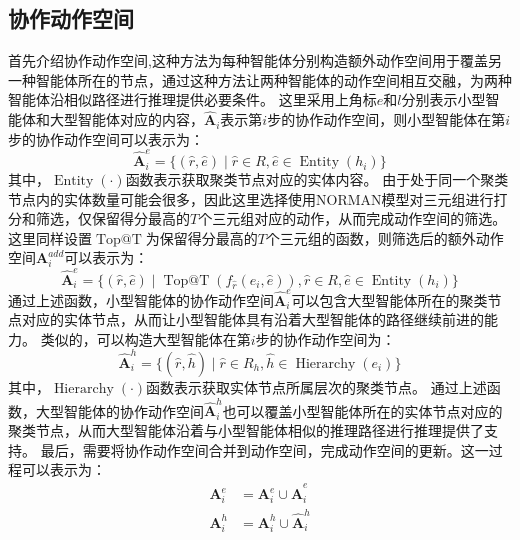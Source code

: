 \documentclass[algorithmlist, AutoFakeBold, AutoFakeSlant, figurelist, tablelist, nomlist, engineering, openany]{seuthesix} %
\begin{document}
\subsection{协作动作空间}
首先介绍协作动作空间,这种方法为每种智能体分别构造额外动作空间用于覆盖另一种智能体所在的节点，通过这种方法让两种智能体的动作空间相互交融，为两种智能体沿相似路径进行推理提供必要条件。
这里采用上角标$e$和$l$分别表示小型智能体和大型智能体对应的内容，$\bm{\hat{A}}_i$表示第$i$步的协作动作空间，则小型智能体在第$i$步的协作动作空间可以表示为：
\begin{equation}
  \bm{\hat{A}}_i^{e} = \{(\hat{r}, \hat{e}) \mid \hat{r} \in R, \hat{e} \in \operatorname{Entity}(h_i)\}
\end{equation}
其中，$\operatorname{Entity}(\cdot)$函数表示获取聚类节点对应的实体内容。
由于处于同一个聚类节点内的实体数量可能会很多，因此这里选择使用NORMAN模型对三元组进行打分和筛选，仅保留得分最高的$T$个三元组对应的动作，从而完成动作空间的筛选。
这里同样设置$\operatorname{Top@T}$为保留得分最高的$T$个三元组的函数，则筛选后的额外动作空间$\bm{A}_{i}^{add}$可以表示为：
\begin{equation}
  \bm{\hat{A}}_i^{e} = \{(\hat{r}, \hat{e}) \mid \operatorname{Top@T}(f_{\hat{r}}(e_i, \hat{e})), \hat{r} \in R, \hat{e} \in \operatorname{Entity}(h_i) \}
  \label{coo_1}
\end{equation}
通过上述函数，小型智能体的协作动作空间$\bm{\hat{A}}_i^{e}$可以包含大型智能体所在的聚类节点对应的实体节点，从而让小型智能体具有沿着大型智能体的路径继续前进的能力。
类似的，可以构造大型智能体在第$i$步的协作动作空间为：
\begin{equation}
  \bm{\hat{A}}_i^{h} = \{(\hat{r}, \hat{h}) \mid \hat{r} \in R_h, \hat{h} \in \operatorname{Hierarchy}(e_i)\}
  \label{coo_2}
\end{equation}
其中，$\operatorname{Hierarchy}(\cdot)$函数表示获取实体节点所属层次的聚类节点。
通过上述函数，大型智能体的协作动作空间$\bm{\hat{A}}_i^{h}$也可以覆盖小型智能体所在的实体节点对应的聚类节点，从而大型智能体沿着与小型智能体相似的推理路径进行推理提供了支持。
最后，需要将协作动作空间合并到动作空间，完成动作空间的更新。这一过程可以表示为：
\begin{equation}
  \begin{aligned}
    \bm{A}_i^{e} &= \bm{A}_i^{e} \cup \bm{\hat{A}}_i^{e} \\
    \bm{A}_i^{h} &= \bm{A}_i^{h} \cup \bm{\hat{A}}_i^{h}
  \end{aligned}
\end{equation}
\end{document}
